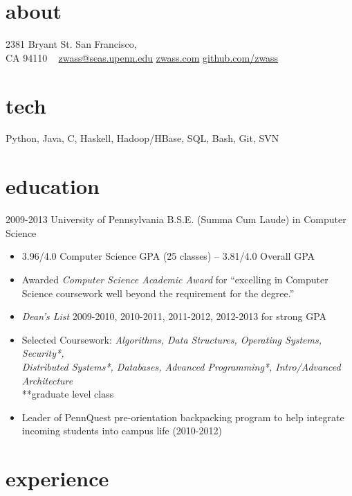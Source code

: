 \documentclass[]{wasserman-cv}
\begin{document}


\begin{aside}
  \section{about}
  2381 Bryant St.
  San Francisco,\\ CA 94110
  ~
  \href{mailto:zwass@seas.upenn.edu}{zwass@seas.upenn.edu}
  \href{http://zwass.com}{zwass.com}
  \href{http://github.com/zwass}{github.com/zwass}
  \section{tech}
  Python, Java,
  C, Haskell,
  Hadoop/HBase,
  SQL, Bash, Git, SVN
\end{aside}

\vspace{\parskip}
\section{education}

\begin{entrylist}
  \entry
    {2009-2013}
    {University of Pennsylvania}
    {B.S.E. (Summa Cum Laude) in Computer Science}
    {\begin{itemize}
      \item 3.96/4.0 Computer Science GPA (25 classes) – 3.81/4.0 Overall GPA
      \item Awarded \emph{Computer Science Academic Award} for ``excelling in Computer Science coursework well beyond the requirement for the degree.''
      \item \emph{Dean’s List} 2009-2010, 2010-2011, 2011-2012, 2012-2013 for strong GPA
      \item Selected Coursework: \emph{Algorithms, Data Structures, Operating Systems, Security*,\\
          Distributed Systems*, Databases, Advanced
          Programming*, Intro/Advanced Architecture}\\
        **graduate level class
      \item Leader of PennQuest pre-orientation backpacking program to
        help integrate incoming students into campus life (2010-2012)
    \end{itemize}
    }
\end{entrylist}

\section{experience}
\end{document}
